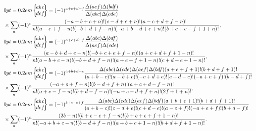 \begin{align}
& \sixj{a}{b}{c}{d}{e}{f}=(-1)^{a+c+d+f} \frac{\Delta(a e f) \Delta(b d f)}{\Delta(a b c) \Delta(c d e)}  \notag\\
& \times \sum_{n}(-1)^{n} \frac{(-a+b+c+n)!(c-d+e+n)!(a-c+d+f-n)!}{n!(a-e+f-n)!(-b+d+f-n)!(-a+b-d+e+n)!(b+c+e-f+1+n)!},  \label{eq:9:2:3}\\
& \sixj{a}{b}{c}{d}{e}{f}=(-1)^{a+c+d+f} \frac{\Delta(a b c) \Delta(b d f)}{\Delta(a e f) \Delta(c d e)}  \notag\\
& \times \sum_{n}(-1)^{n} \frac{(a-b+d+e-n)!(-b+c+e+f-n)!(a+c+d+f+1-n)!}{n!(a-b+c-n)!(-b+d+f-n)!(a+e+f+1-n)!(c+d+e+1-n)!},  \label{eq:9:2:4}\\
& \sixj{a}{b}{c}{d}{e}{f}=(-1)^{a+b+d+e} \frac{\Delta(a b c) \Delta(c d e) \Delta(a e f) \Delta(b d f)(a+e+f+1)!(b+d+f+1)!}{(a+b-c)!(a-b+c)!(-c+d+e)!(c+d-e)!(-a+e+f)!(b-d+f)!}  \notag\\
& \times \sum_{n}(-1)^{n} \frac{(-a+e+f+n)!(b-d+f+n)!(a+c+d-f-n)!}{n!(a+e-f-n)!(b+d-f-n)!(-a+c-d+f+n)!(2 f+1+n)!},  \label{eq:9:2:5}\\
& \sixj{a}{b}{c}{d}{e}{f}=(-1)^{b+c+e+f} \frac{\Delta(a b c) \Delta(c d e) \Delta(a e f) \Delta(b d f)(a+b+c+1)!(b+d+f+1)!}{(a+b-c)!(c-d+e)!(c+d-e)!(a-e+f)!(-a+e+f)!(b+d-f)!}  \notag\\
& \times \sum_{n}(-1)^{n} \frac{(2 b-n)!(b+c-e+f-n)!(b+c+e+f+1-n)!}{n!(-a+b+c-n)!(b-d+f-n)!(a+b+c+1-n)!(b+d+f+1-n)!} . \label{eq:9:2:6}
\end{align}
